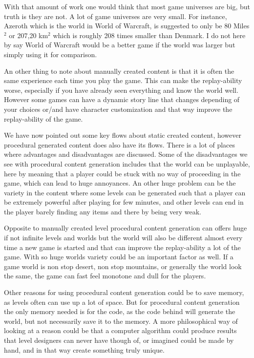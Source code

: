 With that amount of work one would think that most game universes are big, but truth is they are not. A lot of game universes are very small. For instance, Azeroth which is the world in World of Warcraft, is suggested to only be 80 Miles$^2$ or 207,20 km$^2$ \cite{GameWorldSize} which is roughly 208 times smaller than Denmark. I do not here by say World of Warcraft would be a better game if the world was larger but simply using it for comparison.

An other thing to note about manually created content is that it is often the same experience each time you play the game. This can make the replay-ability worse, especially if you have already seen everything and know the world well. However some games can have a dynamic story line that changes depending of your choices or/and have character customization and that way improve the replay-ability of the game.

We have now pointed out some key flows about static created content, however procedural generated content does also have its flows. There is a lot of places where advantages and disadvantages are discussed. Some of the disadvantages we see with procedural content generation includes that the world can be unplayable, here by meaning that a player could be stuck with no way of proceeding in the game, which can lead to huge annoyances. An other huge problem can be the variety in the content where some levels can be generated such that a player can be extremely powerful after playing for few minutes, and other levels can end in the player barely finding any items and there by being very weak.

Opposite to manually created level procedural content generation can offers huge if not infinite levels and worlds but the world will also be different almost every time a new game is started and that can improve the replay-ability a lot of the game. With so huge worlds variety could be an important factor as well. If a game world is non stop desert, non stop mountains, or generally the world look the same, the game can fast feel monotone and dull for the players.

Other reasons for using procedural content generation could be to save memory, as levels often can use up a lot of space. But for procedural content generation the only memory needed is for the code, as the code behind will generate the world, but not necessarily save it to the memory. A more philosophical way of looking at a reason could be that a computer algorithm could produce results that level designers can never have though of, or imagined could be made by hand, and in that way create something truly unique.